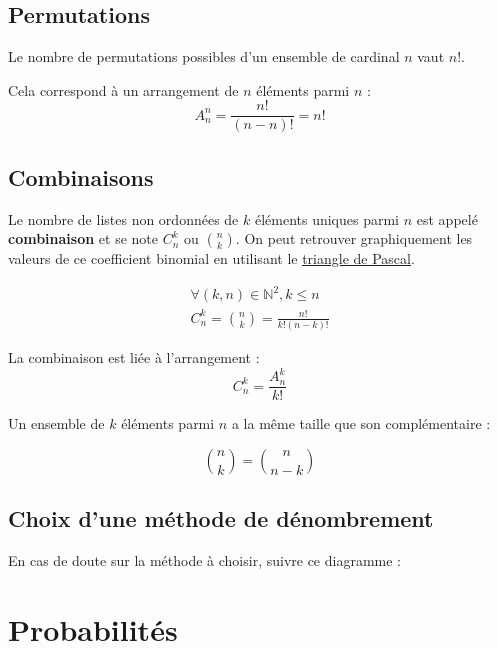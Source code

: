 \subsection{Permutations}

Le nombre de permutations possibles d'un ensemble de cardinal $n$ vaut $n!$.

\begin{remarque}
	Cela correspond à un arrangement de $n$ éléments parmi $n$ :
	\begin{equation*}
		A^n_n = \frac{n!}{(n-n)!} = n!
	\end{equation*}
\end{remarque}

\subsection{Combinaisons}

Le nombre de listes non ordonnées de $k$ éléments uniques parmi $n$ est appelé \textbf{combinaison} et se note $C^k_n$ ou $\binom{n}{k}$. On peut retrouver graphiquement les valeurs de ce coefficient binomial en utilisant le \href{https://en.wikipedia.org/wiki/Pascal%27s_triangle}{triangle de Pascal}.

\begin{definition}
	\begin{equation*}
		\begin{split}
			\forall (k,n) \in \mathbb{N}^2, k \le n \\
			C^k_n = \binom{n}{k} = \frac{n!}{k!(n-k)!}
		\end{split}
	\end{equation*}
\end{definition}

\begin{remarque}
	La combinaison est liée à l'arrangement :
	\begin{equation*}
		C^k_n = \frac{A^k_n}{k!}
	\end{equation*}
\end{remarque}

\begin{remarque}
	Un ensemble de $k$ éléments parmi $n$ a la même taille que son complémentaire :

	\begin{equation*}
		\binom{n}{k} = \binom{n}{n-k}
	\end{equation*}
\end{remarque}

\subsection{Choix d'une méthode de dénombrement}

En cas de doute sur la méthode à choisir, suivre ce diagramme :
\newline



\section{Probabilités}